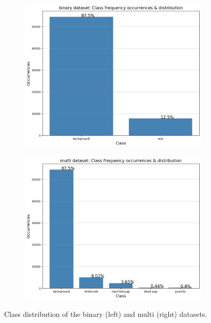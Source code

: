 \documentclass[letterpaper,12pt]{article}
\begin{document}
\begin{figure}[h]
\centering
\begin{subfigure}{.5\textwidth}
  \centering
  \includegraphics[width=\textwidth]{report/figures/binary_class_distribution.png}
  \label{fig:binary_class_distribution}
\end{subfigure}%
\begin{subfigure}{.5\textwidth}
  \centering
  \includegraphics[width=\textwidth]{report/figures/multi_class_distribution.png}
  \label{fig:multi_class_distribution}
\end{subfigure}
\caption{\label{fig:class_distribution}Class distribution of the binary (left) and multi (right) datasets.}
\end{figure}
\end{document}

